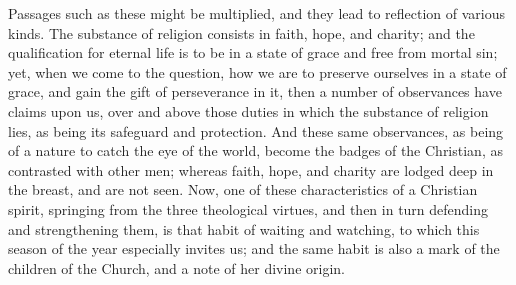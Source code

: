 Passages such as these might be multiplied, and they
lead to reflection of various kinds. The substance of
religion consists in faith, hope, and charity; and the
qualification for eternal life is to be in a state of
grace and free from mortal sin; yet, when we come to the
question, how we are to preserve ourselves in a state of
grace, and gain the gift of perseverance in it, then a
number of observances have claims upon us, over and above
those duties in which the substance of religion lies, as
being its safeguard and protection. And these same
observances, as being of a nature to catch the eye of the
world, become the badges of the Christian, as contrasted
with other men; whereas faith, hope, and charity are
lodged deep in the breast, and are not seen. Now, one of
these characteristics of a Christian spirit, springing
from the three theological virtues, and then in turn
defending and strengthening them, is that habit of
waiting and watching, to which this season of the year
especially invites us; and the same habit is also a mark
of the children of the Church, and a note of her divine
origin.

